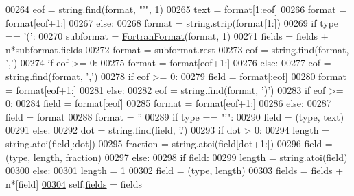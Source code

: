 \begin{DoxyCode}
{{{{00264                 eof = string.find(format, \textcolor{stringliteral}{"'"}, 1)
00265                 text = format[1:eof]
00266                 format = format[eof+1:]
00267             \textcolor{keywordflow}{else}:
00268                 format = string.strip(format[1:])
00269             \textcolor{keywordflow}{if} type == \textcolor{stringliteral}{'('}:
00270                 subformat = \hyperlink{classpyneb_1_1utils_1_1_fortran_format_1_1_fortran_format}{FortranFormat}(format, 1)
00271                 fields = fields + n*subformat.fields
00272                 format = subformat.rest
00273                 eof = string.find(format, \textcolor{stringliteral}{','})
00274                 \textcolor{keywordflow}{if} eof >= 0:
00275                     format = format[eof+1:]
00276             \textcolor{keywordflow}{else}:
00277                 eof = string.find(format, \textcolor{stringliteral}{','})
00278                 \textcolor{keywordflow}{if} eof >= 0:
00279                     field = format[:eof]
00280                     format = format[eof+1:]
00281                 \textcolor{keywordflow}{else}:
00282                     eof = string.find(format, \textcolor{stringliteral}{')'})
00283                     \textcolor{keywordflow}{if} eof >= 0:
00284                         field = format[:eof]
00285                         format = format[eof+1:]
00286                     \textcolor{keywordflow}{else}:
00287                         field = format
00288                         format = \textcolor{stringliteral}{''}
00289                 \textcolor{keywordflow}{if} type == \textcolor{stringliteral}{"'"}:
00290                     field = (type, text)
00291                 \textcolor{keywordflow}{else}:
00292                     dot = string.find(field, \textcolor{stringliteral}{'.'})
00293                     \textcolor{keywordflow}{if} dot > 0:
00294                         length = string.atoi(field[:dot])
00295                         fraction = string.atoi(field[dot+1:])
00296                         field = (type, length, fraction)
00297                     \textcolor{keywordflow}{else}:
00298                         \textcolor{keywordflow}{if} field:
00299                             length = string.atoi(field)
00300                         \textcolor{keywordflow}{else}:
00301                             length = 1
00302                         field = (type, length)
00303                 fields = fields + n*[field]
\hypertarget{_fortran_format_8py_source_l00304}{}\hyperlink{classpyneb_1_1utils_1_1_fortran_format_1_1_fortran_format_ac8f962282ba9e35ccd8dad5feacd3813}{00304}         self.\hyperlink{classpyneb_1_1utils_1_1_fortran_format_1_1_fortran_format_ac8f962282ba9e35ccd8dad5feacd3813}{fields} = fields
}}}}
\end{DoxyCode}
